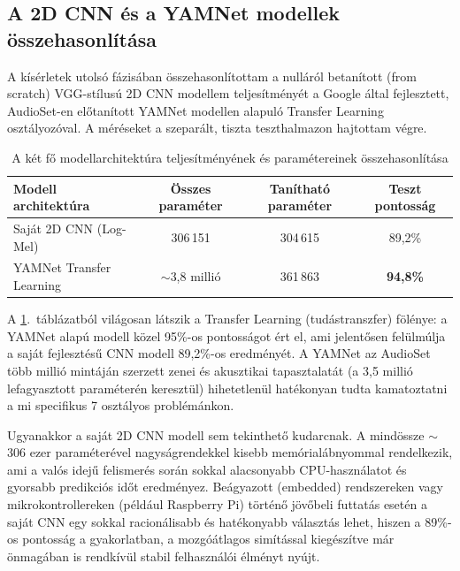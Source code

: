 \subsection{A 2D CNN és a YAMNet modellek összehasonlítása}

A kísérletek utolsó fázisában összehasonlítottam a nulláról betanított (from scratch) VGG-stílusú 2D CNN modellem teljesítményét a Google által fejlesztett, AudioSet-en előtanított YAMNet modellen alapuló Transfer Learning osztályozóval. A méréseket a szeparált, tiszta teszthalmazon hajtottam végre.

\begin{table}[H]
\centering
\caption{A két fő modellarchitektúra teljesítményének és paramétereinek összehasonlítása}
\label{tab:model_comparison}
\begin{tabular}{lccc}
\toprule
\textbf{Modell architektúra} & \textbf{Összes paraméter} & \textbf{Tanítható paraméter} & \textbf{Teszt pontosság} \\
\midrule
Saját 2D CNN (Log-Mel) & 306\,151 & 304\,615 & 89,2\% \\
YAMNet Transfer Learning & $\sim$3,8 millió & 361\,863 & \textbf{94,8\%} \\
\bottomrule
\end{tabular}
\end{table}

A \ref{tab:model_comparison}.~táblázatból világosan látszik a Transfer Learning (tudástranszfer) fölénye: a YAMNet alapú modell közel 95\%-os pontosságot ért el, ami jelentősen felülmúlja a saját fejlesztésű CNN modell 89,2\%-os eredményét. A YAMNet az AudioSet több millió mintáján szerzett zenei és akusztikai tapasztalatát (a 3,5 millió lefagyasztott paraméterén keresztül) hihetetlenül hatékonyan tudta kamatoztatni a mi specifikus 7 osztályos problémánkon.

Ugyanakkor a saját 2D CNN modell sem tekinthető kudarcnak. A mindössze $\sim$306 ezer paraméterével nagyságrendekkel kisebb memórialábnyommal rendelkezik, ami a valós idejű felismerés során sokkal alacsonyabb CPU-használatot és gyorsabb predikciós időt eredményez. Beágyazott (embedded) rendszereken vagy mikrokontrollereken (például Raspberry Pi) történő jövőbeli futtatás esetén a saját CNN egy sokkal racionálisabb és hatékonyabb választás lehet, hiszen a 89\%-os pontosság a gyakorlatban, a mozgóátlagos simítással kiegészítve már önmagában is rendkívül stabil felhasználói élményt nyújt.
